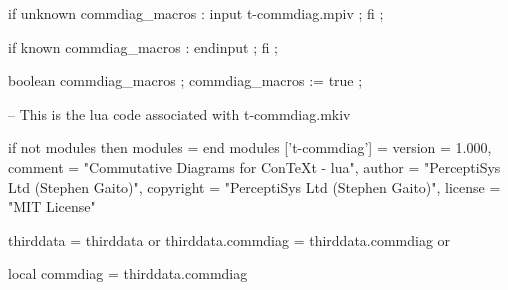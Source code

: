 
\startchapter[title=Preamble]

\startMkIVCode

%
%

%

%
    if unknown commdiag_macros : input t-commdiag.mpiv ; fi ;
\stopMPdefinitions

\stopMkIVCode

\startMkIVCode
{}

\unprotect

\stopMkIVCode

\startMpIVCode

%
%

if known commdiag_macros : endinput ; fi ;

boolean commdiag_macros ; commdiag_macros := true ;

\stopMpIVCode

\startLuaCode
-- This is the lua code associated with t-commdiag.mkiv

if not modules then modules = { } end modules ['t-commdiag'] = {
    version   = 1.000,
    comment   = "Commutative Diagrams for ConTeXt - lua",
    author    = "PerceptiSys Ltd (Stephen Gaito)",
    copyright = "PerceptiSys Ltd (Stephen Gaito)",
    license   = "MIT License"
}

thirddata            = thirddata          or {}
thirddata.commdiag   = thirddata.commdiag or {}

local commdiag       = thirddata.commdiag
\stopLuaCode

\stopchapter
